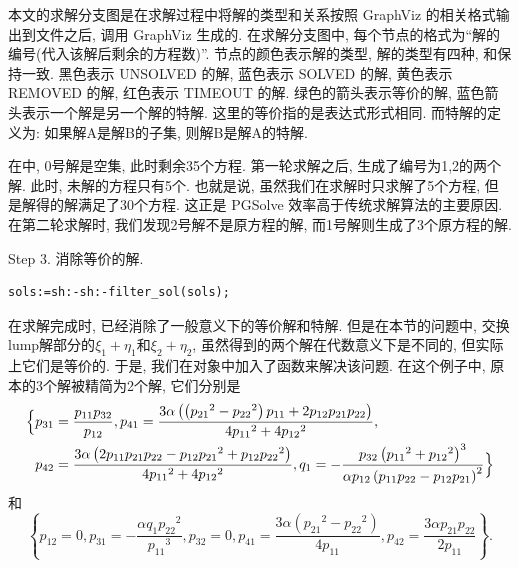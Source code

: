 本文的求解分支图是在求解过程中将解的类型和关系按照 GraphViz\cite{ellson2001graphviz} 的相关格式输出到文件之后, 调用 GraphViz 生成的. 在求解分支图中, 每个节点的格式为``解的编号(代入该解后剩余的方程数)''. 节点的颜色表示解的类型, 解的类型有四种, 和保持一致. 黑色表示 UNSOLVED 的解, 蓝色表示 SOLVED 的解, 黄色表示 REMOVED 的解, 红色表示 TIMEOUT 的解. 绿色的箭头表示等价的解, 蓝色箭头表示一个解是另一个解的特解. 这里的等价指的是表达式形式相同. 而特解的定义为: 如果解A是解B的子集, 则解B是解A的特解. 

在中, 0号解是空集, 此时剩余35个方程. 第一轮求解之后, 生成了编号为1,2的两个解. 此时, 未解的方程只有5个. 也就是说, 虽然我们在求解时只求解了5个方程, 但是解得的解满足了30个方程. 这正是 PGSolve 效率高于传统求解算法的主要原因. 在第二轮求解时, 我们发现2号解不是原方程的解, 而1号解则生成了3个原方程的解. 

Step 3. 消除等价的解.
\begin{verbatim}
sols:=sh:-sh:-filter_sol(sols);
\end{verbatim}
在求解完成时, 已经消除了一般意义下的等价解和特解. 但是在本节的问题中, 交换lump解部分的$\xi_1+\eta_1$和$\xi_2+\eta_2$, 虽然得到的两个解在代数意义下是不同的, 但实际上它们是等价的. 于是, 我们在对象中加入了函数来解决该问题. 在这个例子中, 原本的3个解被精简为2个解, 它们分别是
\begin{equation}
\begin{split}
\Bigl\{ 
& p_{{31}}={\frac {p_{{11}}p_{{32}}}{p_{{12}}}}, 
p_{{41}}={\frac {3\alpha \left(  \left( {p_{{21}}}^{2}-{p_{{22}}}^{2} \right) p_{{11}}+2p_{{12}}p_{{21}}p_{{22}} \right) }{4{p_{{11}}}^{2}+4{p_{{12}}}^{2}}}, \\
& p_{{42}}={\frac {3\alpha \left( 2p_{{11}}p_{{21}}p_{{22}}-p_{{12}}{p_{{21}}}^{2}+p_{{12}}{p_{{22}}}^{2}\right) }{4{p_{{11}}}^{2}+4{p_{{12}}}^{2}}}, 
q_{{1}}=-{\frac {p_{{32}} \left( {p_{{11}}}^{2}+{p_{{12}}}^{2} \right) ^{3}}{\alpha p_{{12}} \left( p_{{11}}p_{{22}}-p_{{12}}p_{{21}} \right) ^{2}}} 
 \Bigr\} 
\end{split}
\label{0S1L-1}
\end{equation}
和
\begin{equation}
 \left\{ p_{{12}}=0,p_{{31}}=-{\frac {\alpha q_{{1}}{p_{{22}}}^{2}
}{{p_{{11}}}^{3}}},p_{{32}}=0,p_{{41}}={\frac {3\alpha
 \left( {p_{{21}}}^{2}-{p_{{22}}}^{2} \right) }{4p_{{11}}}},p_{{42}
}={\frac {3\alpha p_{{21}}p_{{22}}}{2p_{{11}}}} \right\} . \label{0S1L-2}
\end{equation}

